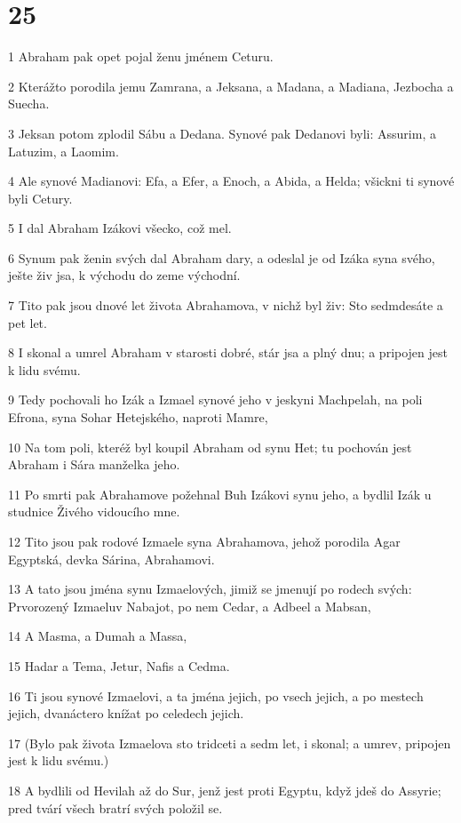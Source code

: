 \chapter{25}

\par 1 Abraham pak opet pojal ženu jménem Ceturu.
\par 2 Kterážto porodila jemu Zamrana, a Jeksana, a Madana, a Madiana, Jezbocha a Suecha.
\par 3 Jeksan potom zplodil Sábu a Dedana. Synové pak Dedanovi byli: Assurim, a Latuzim, a Laomim.
\par 4 Ale synové Madianovi: Efa, a Efer, a Enoch, a Abida, a Helda; všickni ti synové byli Cetury.
\par 5 I dal Abraham Izákovi všecko, což mel.
\par 6 Synum pak ženin svých dal Abraham dary, a odeslal je od Izáka syna svého, ješte živ jsa, k východu do zeme východní.
\par 7 Tito pak jsou dnové let života Abrahamova, v nichž byl živ: Sto sedmdesáte a pet let.
\par 8 I skonal a umrel Abraham v starosti dobré, stár jsa a plný dnu; a pripojen jest k lidu svému.
\par 9 Tedy pochovali ho Izák a Izmael synové jeho v jeskyni Machpelah, na poli Efrona, syna Sohar Hetejského, naproti Mamre,
\par 10 Na tom poli, kteréž byl koupil Abraham od synu Het; tu pochován jest Abraham i Sára manželka jeho.
\par 11 Po smrti pak Abrahamove požehnal Buh Izákovi synu jeho, a bydlil Izák u studnice Živého vidoucího mne.
\par 12 Tito jsou pak rodové Izmaele syna Abrahamova, jehož porodila Agar Egyptská, devka Sárina, Abrahamovi.
\par 13 A tato jsou jména synu Izmaelových, jimiž se jmenují po rodech svých: Prvorozený Izmaeluv Nabajot, po nem Cedar, a Adbeel a Mabsan,
\par 14 A Masma, a Dumah a Massa,
\par 15 Hadar a Tema, Jetur, Nafis a Cedma.
\par 16 Ti jsou synové Izmaelovi, a ta jména jejich, po vsech jejich, a po mestech jejich, dvanáctero knížat po celedech jejich.
\par 17 (Bylo pak života Izmaelova sto tridceti a sedm let, i skonal; a umrev, pripojen jest k lidu svému.)
\par 18 A bydlili od Hevilah až do Sur, jenž jest proti Egyptu, když jdeš do Assyrie; pred tvárí všech bratrí svých položil se.
